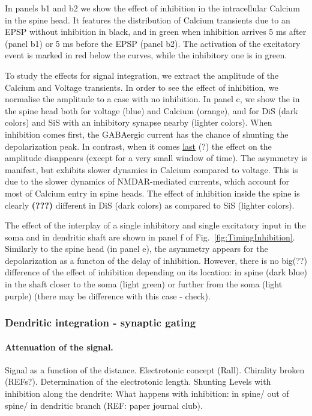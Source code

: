 \documentclass[10pt,letterpaper]{article}
\begin{document}
In panels b1 and b2 we show the effect of inhibition in the intracellular Calcium in the spine head. It features the distribution of Calcium transients due to an EPSP without inhibition in black, and in green when inhibition arrives 5 ms after (panel b1) or 5 ms before the EPSP (panel b2). The activation of the excitatory event is marked in red  below the curves, while the inhibitory one is in green.

To study the effects for signal integration, we extract the amplitude of the Calcium and Voltage transients. In order to see the effect of inhibition, we normalise the amplitude to a case with no inhibition. In panel c, we show the  in the spine head both for voltage (blue) and Calcium (orange), and for DiS (dark colors) and SiS with an inhibitory synapse nearby (lighter colors). When inhibition comes first, the GABAergic current has the chance of shunting the depolarization peak. In contrast, when it comes \underline{last} (?) the effect on the amplitude disappears (except for a very small window of time). The asymmetry is manifest, but exhibits slower dynamics in Calcium compared to voltage. This is due to the slower dynamics of NMDAR-mediated currents, which account for most of  Calcium entry in spine heads. The effect of inhibition inside the spine is clearly \textbf{(???)} different in DiS (dark colors) as compared to SiS (lighter colors). 

The effect of the interplay of a single inhibitory and single excitatory input in the soma and in dendritic shaft are shown in panel f of Fig.~\ref{fig:TimingInhibition}. Similarly to the spine head (in panel e), the asymmetry appears for the depolarization as a functon of the delay of inhibition. However, there is no big(??) difference of the effect of inhibition depending on its location: in spine (dark blue) in the shaft closer to the soma (light green) or further from the soma   (light purple) (there may be difference with this case - check). 


\subsubsection*{Dendritic integration - synaptic gating}
\paragraph*{Attenuation of the signal.} Signal as a function of the distance. Electrotonic concept (Rall). Chirality broken (REFs?). Determination of the electrotonic length. Shunting Levels with inhibition along the dendrite: What happens with inhibition: in spine/ out of spine/ 
in dendritic branch (REF: paper journal club).
\end{document}
